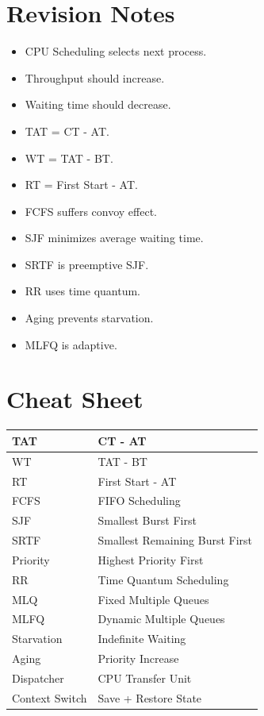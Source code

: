 \section{Revision Notes}

\begin{itemize}
\item CPU Scheduling selects next process.
\item Throughput should increase.
\item Waiting time should decrease.
\item TAT = CT - AT.
\item WT = TAT - BT.
\item RT = First Start - AT.
\item FCFS suffers convoy effect.
\item SJF minimizes average waiting time.
\item SRTF is preemptive SJF.
\item RR uses time quantum.
\item Aging prevents starvation.
\item MLFQ is adaptive.
\end{itemize}

\section{Cheat Sheet}

\begin{center}
\begin{tabular}{|p{5cm}|p{8cm}|}
\hline
TAT & CT - AT \\
\hline
WT & TAT - BT \\
\hline
RT & First Start - AT \\
\hline
FCFS & FIFO Scheduling \\
\hline
SJF & Smallest Burst First \\
\hline
SRTF & Smallest Remaining Burst First \\
\hline
Priority & Highest Priority First \\
\hline
RR & Time Quantum Scheduling \\
\hline
MLQ & Fixed Multiple Queues \\
\hline
MLFQ & Dynamic Multiple Queues \\
\hline
Starvation & Indefinite Waiting \\
\hline
Aging & Priority Increase \\
\hline
Dispatcher & CPU Transfer Unit \\
\hline
Context Switch & Save + Restore State \\
\hline
\end{tabular}
\end{center}